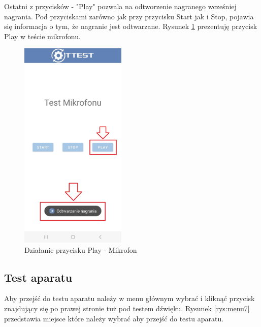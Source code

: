 \newpage


Ostatni z przycisków - "Play" pozwala na odtworzenie nagranego wcześniej nagrania. Pod przyciskami zarówno jak przy przycisku Start jak i Stop, pojawia się informacja o tym, że nagranie jest odtwarzane. Rysunek \ref{rys:mikrofon3} prezentuję przycisk Play w teście mikrofonu.

\begin{figure}[!hbt]
	\begin{center}
		\includegraphics[angle=360, width=0.45\textwidth]{rys/punkt6/mikrofon3}
		\caption{Działanie przycisku Play - Mikrofon}
		\label{rys:mikrofon3}
	\end{center}
\end{figure}

\newpage


\subsection{Test aparatu}

\hspace{0.60cm}Aby przejść do testu aparatu należy w menu głównym wybrać i kliknąć przycisk znajdujący się po prawej stronie tuż pod testem dźwięku. Rysunek \ref{rys:menu7} przedstawia miejsce które należy wybrać aby przejść do testu aparatu.

